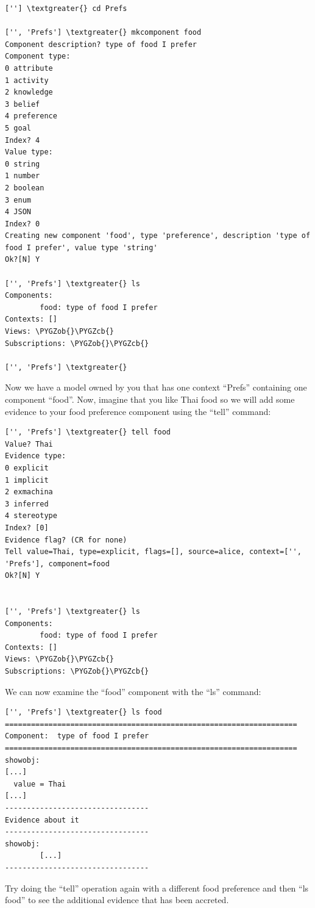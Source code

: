 \documentclass[letterpaper,10pt,english]{sphinxmanual}
\def\PYGZob{\char`\{}
\def\PYGZcb{\char`\}}
\begin{document}
\begin{Verbatim}[commandchars=\\\{\}]
[''] \textgreater{} cd Prefs

['', 'Prefs'] \textgreater{} mkcomponent food
Component description? type of food I prefer
Component type:
0 attribute
1 activity
2 knowledge
3 belief
4 preference
5 goal
Index? 4
Value type:
0 string
1 number
2 boolean
3 enum
4 JSON
Index? 0
Creating new component 'food', type 'preference', description 'type of food I prefer', value type 'string'
Ok?[N] Y

['', 'Prefs'] \textgreater{} ls
Components:
        food: type of food I prefer
Contexts: []
Views: \PYGZob{}\PYGZcb{}
Subscriptions: \PYGZob{}\PYGZcb{}

['', 'Prefs'] \textgreater{}
\end{Verbatim}

Now we have a model owned by you that has one
context ``Prefs'' containing one component ``food''.
Now, imagine that you like Thai food so we will add some evidence to your food
preference component using the ``tell'' command:

\begin{Verbatim}[commandchars=\\\{\}]
['', 'Prefs'] \textgreater{} tell food
Value? Thai
Evidence type:
0 explicit
1 implicit
2 exmachina
3 inferred
4 stereotype
Index? [0]
Evidence flag? (CR for none)
Tell value=Thai, type=explicit, flags=[], source=alice, context=['', 'Prefs'], component=food
Ok?[N] Y


['', 'Prefs'] \textgreater{} ls
Components:
        food: type of food I prefer
Contexts: []
Views: \PYGZob{}\PYGZcb{}
Subscriptions: \PYGZob{}\PYGZcb{}
\end{Verbatim}

We can now examine the ``food'' component with the ``ls'' command:

\begin{Verbatim}[commandchars=\\\{\}]
['', 'Prefs'] \textgreater{} ls food
===================================================================
Component:  type of food I prefer
===================================================================
showobj:
[...]
  value = Thai
[...]
---------------------------------
Evidence about it
---------------------------------
showobj:
        [...]
---------------------------------
\end{Verbatim}

Try doing the ``tell'' operation again with a different food preference and then ``ls food'' to see the additional
evidence that has been accreted.
\end{document}
